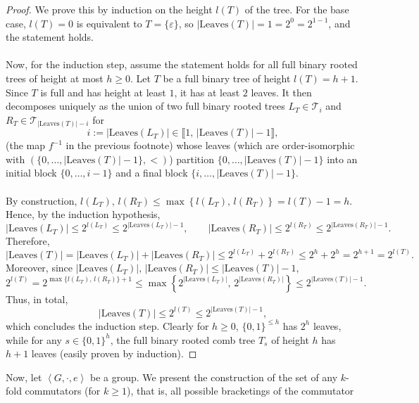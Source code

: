 \documentclass[11pt, a4paper, oneside]{article}
\theoremstyle{remark}
\theoremstyle{lemma}
\begin{document}
\begin{proof}
We prove this by induction on the height \(l(T)\) of the tree.  
For the base case, \(l(T) = 0\) is equivalent to \(T = \{\varepsilon\}\), so \(|\mathrm{Leaves}(T)| = 1 = 2^{0} = 2^{1-1}\), and the statement holds.  
\\\\
Now, for the induction step, assume the statement holds for all full binary rooted trees of height at most \(h \geq 0\). Let \(T\) be a full binary tree of height \(l(T) = h+1\). Since \(T\) is full and has height at least \(1\), it has at least \(2\) leaves. It then decomposes uniquely as the union of two full binary rooted trees 
\(L_T \in \mathcal{T}_{i}\) and \(R_T \in \mathcal{T}_{\left|\mathrm{Leaves}\!\left(T\right)\right|-i}\) for 
\[
i := \left|\mathrm{Leaves}\!\left(L_T\right)\right| \in \llbracket 1,\,\left|\mathrm{Leaves}\!\left(T\right)\right|-1\rrbracket,
\]
(the map \(f^{-1}\) in the previous footnote) whose leaves (which are order-isomorphic with 
\(\left(\{0,\dots,\left|\mathrm{Leaves}\!\left(T\right)\right|-1\},<\right)\)) partition \(\{0,\dots,\left|\mathrm{Leaves}\!\left(T\right)\right|-1\}\) into an initial block 
\(\{0,\dots,i-1\}\) and a final block \(\{i,\dots,\left|\mathrm{Leaves}\!\left(T\right)\right|-1\}\).  
\\\\
By construction, \(l(L_T),\, l(R_T)\leq \max\left\{l(L_T),\, l(R_T)\right\}= l(T)-1 = h\). Hence, by the induction hypothesis,
\[
|\mathrm{Leaves}(L_T)| \leq 2^{l(L_T)} \leq 2^{|\mathrm{Leaves}(L_T)|-1}, \qquad
|\mathrm{Leaves}(R_T)| \leq 2^{l(R_T)} \leq 2^{|\mathrm{Leaves}(R_T)|-1}.
\]  
Therefore,
\[
|\mathrm{Leaves}(T)| = |\mathrm{Leaves}(L_T)| + |\mathrm{Leaves}(R_T)| \leq 2^{l(L_T)} + 2^{l(R_T)} \leq 2^h + 2^h = 2^{h+1} = 2^{l(T)}.
\]
Moreover, since \(|\mathrm{Leaves}(L_T)|,\, |\mathrm{Leaves}(R_T)| \leq |\mathrm{Leaves}(T)|-1\),
\[
2^{l(T)}= 2^{\max\{l(L_T),\,l(R_T)\}+1} \leq \max\!\left\{2^{|\mathrm{Leaves}(L_T)|},\,2^{|\mathrm{Leaves}(R_T)|}\right\} \leq 2^{|\mathrm{Leaves}(T)|-1}.
\]
Thus, in total,
\[
|\mathrm{Leaves}(T)| \leq 2^{l(T)} \leq 2^{|\mathrm{Leaves}(T)|-1},
\]
which concludes the induction step. Clearly for $h\geq 0$, \(\{0,1\}^{\leq h}\) has \(2^h\) leaves, while for any $s\in\{0,1\}^{h}$, the full binary rooted comb tree \(T_s\) of height \(h\) has $h+1$ leaves (easily proven by induction).
\end{proof}
Now, let \(\left\langle G,\cdot,e\right\rangle\) be a group. We present the construction of the set of any 
\(k\)-fold commutators (for \(k \geq 1\)), that is, all possible bracketings of the commutator 
\end{document}
